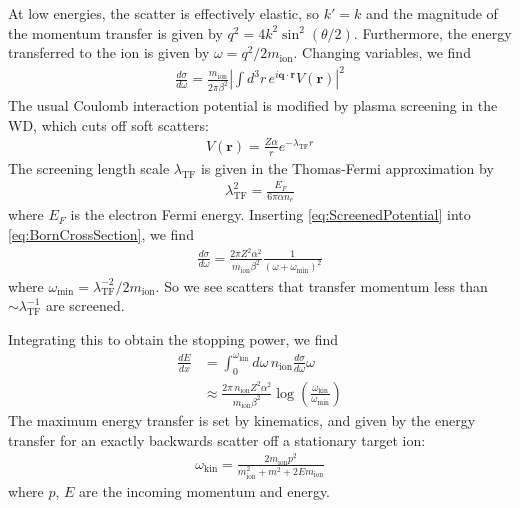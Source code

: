 \documentclass[preprintnumbers,amsmath,amssymb,prd, superscriptaddress,twocolumn]{revtex4}
\begin{document}
\begin{appendices}
At low energies, the scatter is effectively elastic, so $k' = k$ and the magnitude of the momentum transfer is given by $q^2 = 4 k^2\sin^2(\theta/2)$.
Furthermore, the energy transferred to the ion is given by $\omega = q^2 / 2m_\text{ion}$.
Changing variables, we find
\begin{align}
  \label{eq:BornCrossSection}
\frac{d \sigma}{d \omega} = \frac{m_\text{ion}}{2 \pi \beta^2} \left|\int d^3r \, e^{i\textbf{q}\cdot \textbf{r}}V(\textbf{r})\right|^2
\end{align}
The usual Coulomb interaction potential is modified by plasma screening in the WD, which cuts off soft scatters:
\begin{align}
  \label{eq:ScreenedPotential}
V(\textbf{r}) = \frac{Z \alpha}{r} e^{-\lambda_\text{TF} r}
\end{align}
The screening length scale $\lambda_\text{TF}$ is given in the Thomas-Fermi approximation by \cite{Teukolsky}
\begin{align}
\label{eq:TF}
    \lambda_\text{TF}^{2} = \frac{E_F}{6 \pi \alpha n_e}
\end{align}
where $E_F$ is the electron Fermi energy.
Inserting \eqref{eq:ScreenedPotential} into \eqref{eq:BornCrossSection}, we find
\begin{align}
\label{eq:CoulombOffIonsCrossSection}
\frac{d \sigma}{d \omega}
  = \frac{2 \pi Z^2 \alpha^2}{m_\text{ion}\beta^2} \frac{1}{(\omega + \omega_\text{min})^2}
\end{align}
where $\omega_\text{min} = \lambda_\text{TF}^{-2} / 2 m_\text{ion}$.
So we see scatters that transfer momentum less than $ \sim \lambda_\text{TF}^{-1}$ are screened.

Integrating this to obtain the stopping power, we find
\begin{align}
\frac{dE}{d x} &= \int_{0}^{\omega_\text{kin}} d \omega \, n_\text{ion} \frac{d \sigma}{d \omega} \omega \nonumber\\
\label{eq:StoppingPowerOffIons}
 &\approx \frac{2 \pi\, n_\text{ion} Z^2 \alpha^2 }{m_\text{ion}\beta^2} \log\left( \frac{\omega_\text{kin}}{\omega_\text{min}} \right)
\end{align}
The maximum energy transfer is set by kinematics, and given by
the energy transfer for an exactly backwards scatter off a stationary target ion:
\begin{align}
  \omega_\text{kin} = \frac{2 m_\text{ion} p^2}{m_\text{ion}^2 + m^2 + 2E m_\text{ion}}
\end{align}
where $p$, $E$ are the incoming momentum and energy.


\end{appendices}
\end{document}
